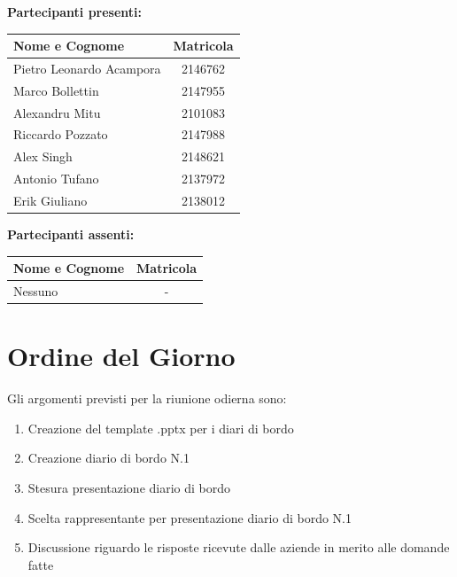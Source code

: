 \documentclass[a4paper, 11pt]{article}
\begin{document}
\vspace{0.5cm}
\textbf{Partecipanti presenti:} \\
\vspace{0.2cm}
\renewcommand{\arraystretch}{1.2}
\begin{tabularx}{0.8\textwidth}{|X|c|}
\hline
\textbf{Nome e Cognome} & \textbf{Matricola} \\ \hline
Pietro Leonardo Acampora & 2146762 \\ \hline
Marco Bollettin & 2147955 \\ \hline
Alexandru Mitu & 2101083 \\ \hline
Riccardo Pozzato & 2147988 \\ \hline
Alex Singh & 2148621 \\ \hline
Antonio Tufano & 2137972 \\ \hline
Erik Giuliano & 2138012 \\ \hline
\end{tabularx}

\vspace{0.5cm}
\textbf{Partecipanti assenti:} \\
\vspace{0.2cm}
\renewcommand{\arraystretch}{1.2}
\begin{tabularx}{0.8\textwidth}{|X|c|}
\hline
\textbf{Nome e Cognome} & \textbf{Matricola} \\ \hline
 Nessuno & - \\ \hline
\end{tabularx}

\vspace{0.5cm}
\section{Ordine del Giorno}
Gli argomenti previsti per la riunione odierna sono:
\begin{enumerate}
    \item Creazione del template .pptx per i diari di bordo
    \item Creazione diario di bordo N.1
    \item Stesura presentazione diario di bordo
    \item Scelta rappresentante per presentazione diario di bordo N.1
    \item Discussione riguardo le risposte ricevute dalle aziende in merito alle domande fatte
\end{enumerate}
\end{document}
